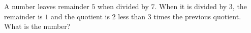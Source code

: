 A number leaves remainder $5$ when divided by $7$. When it is divided by $3$, the remainder is $1$ and the quotient is $2$ less than $3$ times the previous quotient. What is the number?
